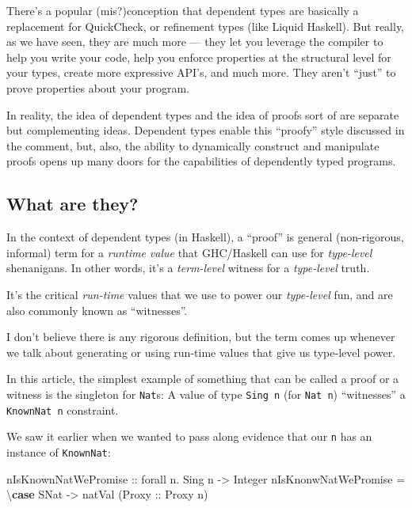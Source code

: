 \documentclass[]{article}
\newenvironment{Shaded}{}{}
\newcommand{\KeywordTok}[1]{\textcolor[rgb]{0.00,0.44,0.13}{\textbf{#1}}}
\newcommand{\DataTypeTok}[1]{\textcolor[rgb]{0.56,0.13,0.00}{#1}}
\newcommand{\OtherTok}[1]{\textcolor[rgb]{0.00,0.44,0.13}{#1}}
\newcommand{\FunctionTok}[1]{\textcolor[rgb]{0.02,0.16,0.49}{#1}}
\newcommand{\NormalTok}[1]{#1}
\begin{document}
There's a popular (mis?)conception that dependent types are basically a
replacement for QuickCheck, or refinement types (like Liquid Haskell). But
really, as we have seen, they are much more --- they let you leverage the
compiler to help you write your code, help you enforce properties at the
structural level for your types, create more expressive API's, and much more.
They aren't ``just'' to prove properties about your program.

In reality, the idea of dependent types and the idea of proofs sort of are
separate but complementing ideas. Dependent types enable this ``proofy'' style
discussed in the comment, but, also, the ability to dynamically construct and
manipulate proofs opens up many doors for the capabilities of dependently typed
programs.

\subsection{What are they?}\label{what-are-they}

In the context of dependent types (in Haskell), a ``proof'' is general
(non-rigorous, informal) term for a \emph{runtime value} that GHC/Haskell can
use for \emph{type-level} shenanigans. In other words, it's a \emph{term-level}
witness for a \emph{type-level} truth.

It's the critical \emph{run-time} values that we use to power our
\emph{type-level} fun, and are also commonly known as ``witnesses''.

I don't believe there is any rigorous definition, but the term comes up whenever
we talk about generating or using run-time values that give us type-level power.

In this article, the simplest example of something that can be called a proof or
a witness is the singleton for \texttt{Nat}s: A value of type \texttt{Sing\ n}
(for \texttt{Nat\ n}) ``witnesses'' a \texttt{KnownNat\ n} constraint.

We saw it earlier when we wanted to pass along evidence that our \texttt{n} has
an instance of \texttt{KnownNat}:

\begin{Shaded}
\begin{Highlighting}[]
\OtherTok{nIsKnownNatWePromise ::}\NormalTok{ forall n}\FunctionTok{.} \DataTypeTok{Sing}\NormalTok{ n }\OtherTok{->} \DataTypeTok{Integer}
\NormalTok{nIsKnonwNatWePromise }\FunctionTok{=}\NormalTok{ \textbackslash{}}\KeywordTok{case}
    \DataTypeTok{SNat} \OtherTok{->}\NormalTok{ natVal (}\DataTypeTok{Proxy}\OtherTok{ ::} \DataTypeTok{Proxy}\NormalTok{ n)}
\end{Highlighting}
\end{Shaded}
\end{document}
